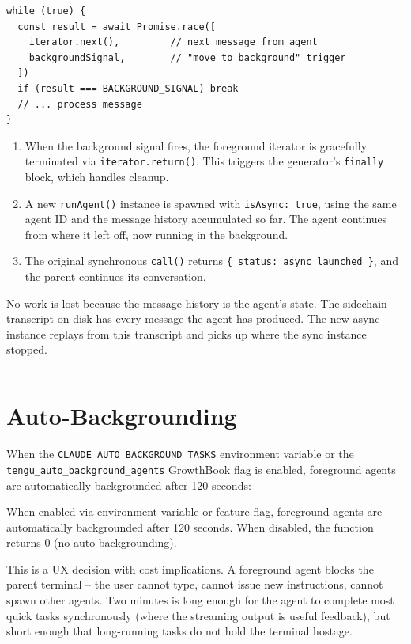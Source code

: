 \documentclass[
  english,
  11pt,
  letterpaper,
]{book}
\begin{document}
\begin{verbatim}
while (true) {
  const result = await Promise.race([
    iterator.next(),         // next message from agent
    backgroundSignal,        // "move to background" trigger
  ])
  if (result === BACKGROUND_SIGNAL) break
  // ... process message
}
\end{verbatim}

\begin{enumerate}
\def\labelenumi{\arabic{enumi}.}
\setcounter{enumi}{2}
\item
  When the background signal fires, the foreground iterator is
  gracefully terminated via \texttt{iterator.return()}. This triggers
  the generator's \texttt{finally} block, which handles cleanup.
\item
  A new \texttt{runAgent()} instance is spawned with
  \texttt{isAsync:\ true}, using the same agent ID and the message
  history accumulated so far. The agent continues from where it left
  off, now running in the background.
\item
  The original synchronous \texttt{call()} returns
  \texttt{\{\ status:\ \textquotesingle{}async\_launched\textquotesingle{}\ \}},
  and the parent continues its conversation.
\end{enumerate}

No work is lost because the message history is the agent's state. The
sidechain transcript on disk has every message the agent has produced.
The new async instance replays from this transcript and picks up where
the sync instance stopped.

\begin{center}\rule{0.5\linewidth}{0.5pt}\end{center}

\section{Auto-Backgrounding}\label{auto-backgrounding}

When the \texttt{CLAUDE\_AUTO\_BACKGROUND\_TASKS} environment variable
or the \texttt{tengu\_auto\_background\_agents} GrowthBook flag is
enabled, foreground agents are automatically backgrounded after 120
seconds:

When enabled via environment variable or feature flag, foreground agents
are automatically backgrounded after 120 seconds. When disabled, the
function returns 0 (no auto-backgrounding).

This is a UX decision with cost implications. A foreground agent blocks
the parent terminal -- the user cannot type, cannot issue new
instructions, cannot spawn other agents. Two minutes is long enough for
the agent to complete most quick tasks synchronously (where the
streaming output is useful feedback), but short enough that long-running
tasks do not hold the terminal hostage.
\end{document}
